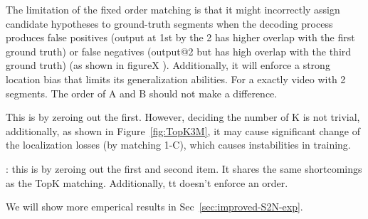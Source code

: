 \documentclass[10pt,journal,compsoc]{IEEEtran}
\begin{document}
  The limitation of the fixed order matching is that it might incorrectly assign candidate hypotheses to ground-truth segments when the decoding process produces false positives (output at 1st by the 2 has higher overlap with the first ground truth) or false negatives (output@2 but has high overlap with the third ground truth) (as shown in figureX ). Additionally, it will enforce a strong location bias that limits its generalization abilities. For a exactly video with 2 segments. The order of A and B should not make a difference.
 
 
 This is by zeroing out the first. However, deciding the number of K is not trivial, additionally, as shown in Figure~\ref{fig:TopK3M}, it may cause significant change of the localization losses (by matching  1-C), which causes instabilities in training.

: this is by zeroing out the first and second item. It shares the same shortcomings as the TopK matching. Additionally, tt doesn't enforce an order.


We will show more emperical results in Sec~\ref{sec:improved-S2N-exp}.  





\end{document}
